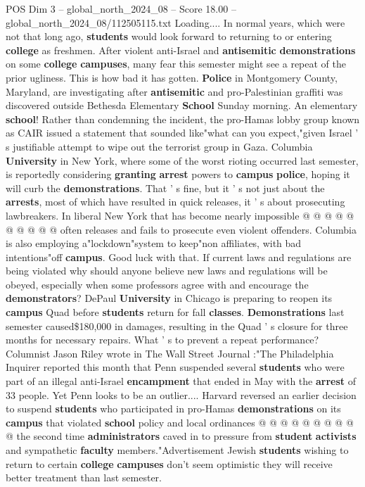 \begin{textsample}{POS Dim 3 – global\_north\_2024\_08 – Score 18.00 – global\_north\_2024\_08/112505115.txt}  \label{ex:f3_pos_145}
Loading....
In normal years, which were not that long ago, \textbf{students} would look forward to returning to or entering \textbf{college} as freshmen.
After violent anti-Israel and \textbf{antisemitic} \textbf{demonstrations} on some \textbf{college} \textbf{campuses}, many fear this semester might see a repeat of the prior ugliness.
This is how bad it has gotten. \textbf{Police} in Montgomery County, Maryland, are investigating after \textbf{antisemitic} and pro-Palestinian graffiti was discovered outside Bethesda Elementary \textbf{School} Sunday morning.
An elementary \textbf{school}!
Rather than condemning the incident, the pro-Hamas lobby group known as CAIR issued a statement that sounded like"what can you expect,"given Israel ' s justifiable attempt to wipe out the terrorist group in Gaza.
Columbia \textbf{University} in New York, where some of the worst rioting occurred last semester, is reportedly considering \textbf{granting} \textbf{arrest} powers to \textbf{campus} \textbf{police}, hoping it will curb the \textbf{demonstrations}.
That ' s fine, but it ' s not just about the \textbf{arrests}, most of which have resulted in quick releases, it ' s about prosecuting lawbreakers.
In liberal New York that has become nearly impossible @ @ @ @ @ @ @ @ @ @ often releases and fails to prosecute even violent offenders.
Columbia is also employing a"lockdown"system to keep"non affiliates, with bad intentions"off \textbf{campus}.
Good luck with that.
If current laws and regulations are being violated why should anyone believe new laws and regulations will be obeyed, especially when some professors agree with and encourage the \textbf{demonstrators}?
DePaul \textbf{University} in Chicago is preparing to reopen its \textbf{campus} Quad before \textbf{students} return for fall \textbf{classes}. \textbf{Demonstrations} last semester caused\$180,000 in damages, resulting in the Quad ' s closure for three months for necessary repairs.
What ' s to prevent a repeat performance?
Columnist Jason Riley wrote in The Wall Street Journal :"The Philadelphia Inquirer reported this month that Penn suspended several \textbf{students} who were part of an illegal anti-Israel \textbf{encampment} that ended in May with the \textbf{arrest} of 33 people.
Yet Penn looks to be an outlier....
Harvard reversed an earlier decision to suspend \textbf{students} who participated in pro-Hamas \textbf{demonstrations} on its \textbf{campus} that violated \textbf{school} policy and local ordinances @ @ @ @ @ @ @ @ @ @ the second time \textbf{administrators} caved in to pressure from \textbf{student} \textbf{activists} and sympathetic \textbf{faculty} members."Advertisement Jewish \textbf{students} wishing to return to certain \textbf{college} \textbf{campuses} don't seem optimistic they will receive better treatment than last semester.

\end{textsample}
